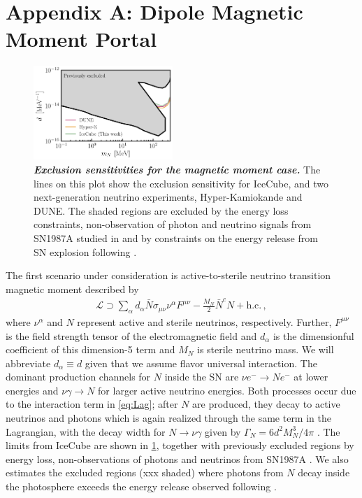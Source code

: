\section{Appendix A: Dipole Magnetic Moment Portal}
\begin{figure}[t!]
    \centering
    \includegraphics[width=0.47\textwidth]{figures/magnetic_moment_sensitivity}
    \caption{\textbf{\textit{Exclusion sensitivities for the magnetic moment case.}}
    The lines on this plot show the exclusion sensitivity for IceCube, and two next-generation neutrino experiments, Hyper-Kamiokande and DUNE. The shaded regions are excluded by the energy loss constraints, non-observation of photon and neutrino signals from SN1987A studied in \cite{Brdar:2023tmi} and by constraints on the energy release from SN explosion following \cite{PhysRevLett.128.221103}.
    }
    \label{fig:magnetic_moment_sensitivity}
\end{figure}
The first scenario under consideration is active-to-sterile neutrino transition magnetic moment described by \cite{Magill:2018jla,Brdar:2020quo,Brdar:2023tmi}
\begin{align}
    \mathcal{L} \supset \sum_\alpha d_\alpha \bar{N}\sigma_{\mu\nu} \nu^{\alpha} F^{\mu\nu}-\frac{M_N}{2} \bar{N}^c N + \text{h.c.}\,,
    \label{eq:Lag}
\end{align}
where $\nu^{\alpha}$ and $N$ represent active and sterile neutrinos, respectively. Further, $F^{\mu\nu}$ is the field strength tensor of the electromagnetic field and $d_\alpha$ is the dimensionful coefficient of this dimension-5 term and $M_N$ is sterile neutrino mass. We will abbreviate $d_\alpha \equiv d$ given that we assume flavor universal interaction. The dominant production channels for $N$ inside the SN are $\nu e^- \to N e^-$ at lower energies and $\nu \gamma \to N$ for larger active neutrino energies. Both processes occur due to the interaction term in \cref{eq:Lag}; after $N$ are produced, they decay to active neutrinos and photons which is again realized through the same term in the Lagrangian, with the decay width for $N\to\nu\gamma$ given by $\Gamma_N = 6d^2 M_N^3/4 \pi$ \cite{Plestid:2020vqf}. The limits from IceCube are shown in \cref{fig:magnetic_moment_sensitivity}, together with previously excluded regions by energy loss, non-observations of photons and neutrinos from SN1987A \cite{Brdar:2023tmi}. We also estimates the excluded regions (xxx shaded) where photons from $N$ decay inside the photosphere exceeds the energy release observed following \cite{PhysRevLett.128.221103}.
